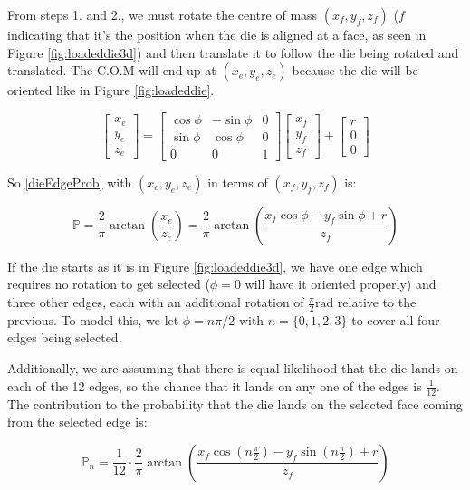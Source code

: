 \documentclass[english,12pt,a4paper,final]{article}
\begin{document}
From steps 1. and 2., we must rotate the centre of mass $(x_f, y_f, z_f)$ ($f$ indicating that it's the position when the die is aligned at a face, as seen in Figure \ref{fig:loadeddie3d}) and then translate it to follow the die being rotated and translated. The C.O.M will end up at $(x_e, y_e, z_e)$ because the die will be oriented like in Figure \ref{fig:loadeddie}.

\begin{equation*}
	\begin{bmatrix}x_e\\y_e\\z_e\end{bmatrix} = \begin{bmatrix}\cos\phi & -\sin\phi & 0 \\ \sin\phi & \cos\phi & 0 \\ 0 & 0 & 1\end{bmatrix} \begin{bmatrix}x_f\\y_f\\z_f\end{bmatrix} + \begin{bmatrix}r\\0\\0\end{bmatrix}
\end{equation*}

So \eqref{dieEdgeProb} with $(x_e, y_e, z_e)$ in terms of $(x_f, y_f, z_f)$ is:

\begin{equation*}
	\mathbb{P} = \frac{2}{\pi}\arctan\left(\frac{x_e}{z_e}\right) = \frac{2}{\pi}\arctan\left(\frac{x_f\cos\phi-y_f\sin\phi+r}{z_f}\right)
\end{equation*}

If the die starts as it is in Figure \ref{fig:loadeddie3d}, we have one edge which requires no rotation to get selected ($\phi=0$ will have it oriented properly) and three other edges, each with an additional rotation of $\frac{\pi}{2} \text{rad}$ relative to the previous. To model this, we let $\phi = n\pi/2 \text{ with } n=\{0, 1, 2, 3\}$ to cover all four edges being selected.

Additionally, we are assuming that there is equal likelihood that the die lands on each of the 12 edges, so the chance that it lands on any one of the edges is $\frac{1}{12}$. The contribution to the probability that the die lands on the selected face coming from the selected edge is:

\begin{equation*}
	\mathbb{P}_n = \frac{1}{12} \cdot \frac{2}{\pi} \arctan\left(\frac{x_f\cos(n\frac{\pi}{2})-y_f\sin(n\frac{\pi}{2})+r}{z_f}\right)
\end{equation*}
\end{document}
